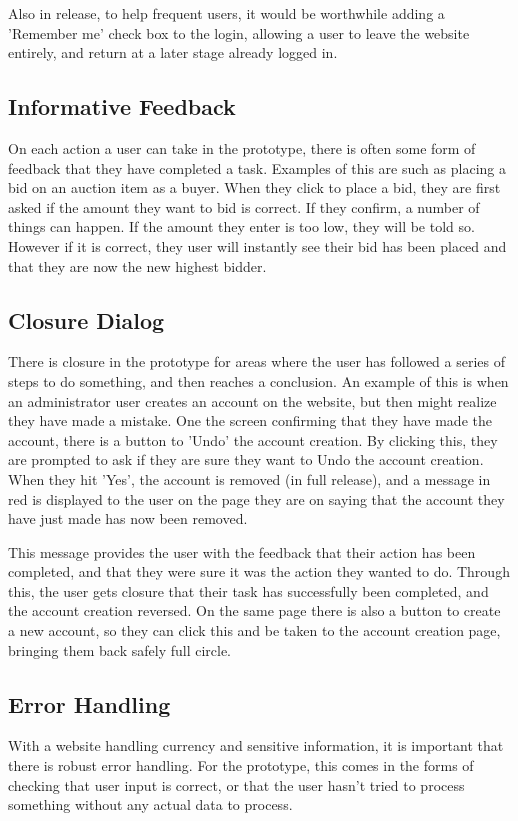 \documentclass{article}
\begin{document}
Also in release, to help frequent users, it would be worthwhile adding a 'Remember me' check box to the login, allowing a user to leave the website entirely, and return at a later stage already logged in.

\subsection{Informative Feedback}
On each action a user can take in the prototype, there is often some form of feedback that they have completed a task. Examples of this are such as placing a bid on an auction item as a buyer. When they click to place a bid, they are first asked if the amount they want to bid is correct. If they confirm, a number of things can happen. If the amount they enter is too low, they will be told so. However if it is correct, they user will instantly see their bid has been placed and that they are now the new highest bidder.

\subsection{Closure Dialog}
There is closure in the prototype for areas where the user has followed a series of steps to do something, and then reaches a conclusion. An example of this is when an administrator user creates an account on the website, but then might realize they have made a mistake. One the screen confirming that they have made the account, there is a button to 'Undo' the account creation. By clicking this, they are prompted to ask if they are sure they want to Undo the account creation. When they hit 'Yes', the account is removed (in full release), and a message in red is displayed to the user on the page they are on saying that  the account they have just made has now been removed.

This message provides the user with the feedback  that their action has been completed, and that they were sure it was the action they wanted to do. Through this, the user gets closure that their task has successfully been completed, and the account creation reversed. On the same page there is also a button to create a new account, so they can click this and be taken to the account creation page, bringing them back safely full circle.

\subsection{Error Handling}
With a website handling currency and sensitive information, it is important that there is robust error handling. For the prototype, this comes in the forms of checking that user input is correct, or that the user hasn't tried to process something without any actual data to process.
\end{document}
